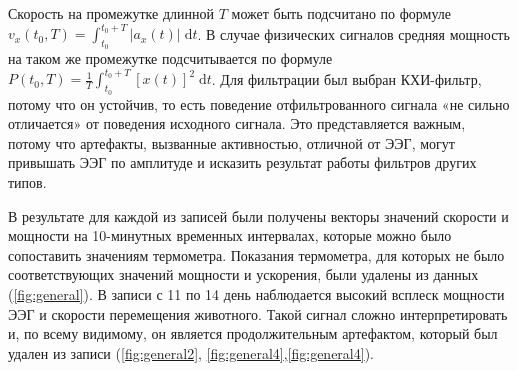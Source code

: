 \documentclass[12pt,a4paper,oneside]{article}
\begin{document}
Скорость на промежутке длинной $T$ может быть подсчитано по формуле $v_{x}(t_0, T) = \int_{t_0}^{t_0 + T} | a_{x}(t)| \; \text{d}t$. В случае физических сигналов средняя мощность на таком же промежутке подсчитывается по формуле $P(t_0, T) = \frac{1}{T} \int_{t_0}^{t_0 + T} [x(t)]^2 \; \text{d}t$. Для фильтрации был выбран КХИ-фильтр, потому что он устойчив, то есть поведение отфильтрованного сигнала «не сильно отличается» от поведения исходного сигнала. Это представляется важным, потому что артефакты, вызванные активностью, отличной от ЭЭГ, могут привышать ЭЭГ по амплитуде и исказить результат работы фильтров других типов.

В результате для каждой из записей были получены векторы значений скорости и мощности на 10-минутных временных интервалах, которые можно было сопоставить значениям термометра. Показания термометра, для которых не было соответствующих значений мощности и ускорения, были удалены из данных (\ref{fig:general}). В записи с 11 по 14 день наблюдается высокий всплеск мощности ЭЭГ и скорости перемещения животного. Такой сигнал сложно интерпретировать и, по всему видимому, он является продолжительным артефактом, который был удален из записи (\ref{fig:general2}, \ref{fig:general4},\ref{fig:general4}). 
\end{document}
